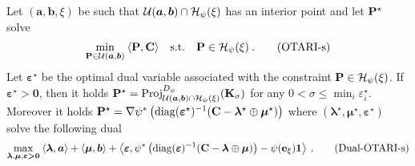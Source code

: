 

\begin{proposition}\label{prop:pcot}
  Let $(\bm{a}, \bm{b}, \xi)$ be such that ${\mathcal{U}}(\bm{a}, \bm{b}) \cap \mathcal{H}_\psi(\xi)$ has an interior point and let ${\mathbf{P}}^\star$ solve
  \begin{align}\label{eq:pcOT}
    \min_{{\mathbf{P}} \in {\mathcal{U}}(\bm{a}, \bm{b})} \: \langle {\mathbf{P}}, \mathbf{C} \rangle \quad \text{s.t.} \quad  {\mathbf{P}} \in \mathcal{H}_\psi(\xi) \:.
    \tag{OTARI-s}
\end{align}
Let $\bm{\varepsilon}^\star$ be the optimal dual variable associated with the constraint ${\mathbf{P}} \in \mathcal{H}_\psi(\xi)$.
If $\bm{\varepsilon}^\star \bm{>} \bm{0}$, then it holds ${\mathbf{P}}^\star = \operatorname{Proj}^{D_\psi}_{{\mathcal{U}}(\bm{a}, \bm{b}) \cap \mathcal{H}_\psi(\xi)}({\mathbf{K}}_\sigma)$ for any $0 < \sigma \leq \min_i{\varepsilon_i^\star}$. Moreover it holds ${\mathbf{P}}^\star = \nabla \psi^* \left(\operatorname{diag}(\bm{\varepsilon}^\star)^{-1} ({\mathbf{C}} - \bm{\lambda}^\star \oplus \bm{\mu}^\star) \right)$ where $(\bm{\lambda}^\star, \bm{\mu}^\star, \bm{\varepsilon}^\star)$ solve the following dual
\begin{align}
  \max_{\bm{\lambda}, \bm{\mu}, \bm{\varepsilon} \bm{>} \bm{0}} \: \langle \bm{\lambda}, \bm{a} \rangle + \langle \bm{\mu}, \bm{b} \rangle + \left\langle \bm{\varepsilon}, \psi^*\left(\operatorname{diag}(\bm{\varepsilon})^{-1} ({\mathbf{C}} - \bm{\lambda} \oplus \bm{\mu}) \right) - \psi(\mathbf{e}_\xi) \bm{1}  \right\rangle \:.
  \tag{Dual-OTARI-s}
\end{align}
\end{proposition}

